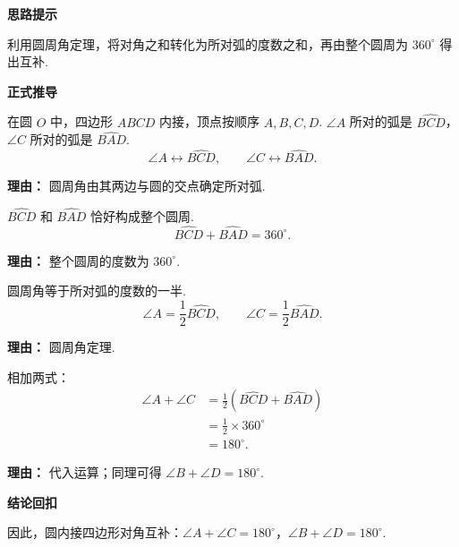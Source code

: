 \begin{proofbox}
	\textbf{\textcolor{CProof}{思路提示}}

	利用圆周角定理，将对角之和转化为所对弧的度数之和，再由整个圆周为 $360^\circ$ 得出互补.

	\medskip
	\textbf{\textcolor{CProof}{正式推导}}
	\begin{description}[style=nextline, leftmargin=2.8em, labelsep=0.5em, itemsep=0.55em]
		\item[\textbf{步骤一（确定对弧）：}]
			在圆 $O$ 中，四边形 $ABCD$ 内接，顶点按顺序 $A,B,C,D$.
			$\angle A$ 所对的弧是 $\widehat{BCD}$，$\angle C$ 所对的弧是 $\widehat{BAD}$.
			\[
				\angle A \longleftrightarrow \widehat{BCD},
				\qquad
				\angle C \longleftrightarrow \widehat{BAD}.
			\]
			\par\textbf{理由：}
			圆周角由其两边与圆的交点确定所对弧.

		\item[\textbf{步骤二（弧长和）：}]
			$\widehat{BCD}$ 和 $\widehat{BAD}$ 恰好构成整个圆周.
			\[
				\widehat{BCD} + \widehat{BAD} = 360^\circ.
			\]
			\par\textbf{理由：}
			整个圆周的度数为 $360^\circ$.

		\item[\textbf{步骤三（圆周角公式）：}]
			圆周角等于所对弧的度数的一半.
			\[
				\angle A = \frac{1}{2}\widehat{BCD},
				\qquad
				\angle C = \frac{1}{2}\widehat{BAD}.
			\]
			\par\textbf{理由：}
			圆周角定理.

		\item[\textbf{步骤四（求和得互补）：}]
			相加两式：
			\[
				\begin{aligned}
					\angle A + \angle C &= \frac{1}{2}(\widehat{BCD}+\widehat{BAD}) \\
					&= \frac{1}{2}\times 360^\circ \\
					&= 180^\circ.
			\end{aligned}
			\]
			\par\textbf{理由：}
			代入运算；同理可得 $\angle B + \angle D = 180^\circ$.
	\end{description}

	\medskip
	\textbf{\textcolor{CProof}{结论回扣}}

	因此，圆内接四边形对角互补：$\angle A+\angle C=180^\circ$，$\angle B+\angle D=180^\circ$.
\end{proofbox}
